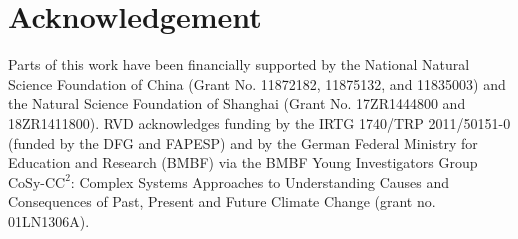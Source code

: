 \documentclass[12pt,aip,cha,reprint,nofootinbib]{revtex4-1}
\begin{document}
\section*{Acknowledgement}
Parts of this work have been financially supported by the National Natural Science Foundation of China (Grant No. 11872182, 11875132, and 11835003) and the Natural Science Foundation of Shanghai (Grant No. 17ZR1444800 and 18ZR1411800). RVD acknowledges funding by the IRTG 1740/TRP 2011/50151-0 (funded by the DFG and FAPESP) and by the German Federal Ministry for Education and Research (BMBF) via the BMBF Young Investigators Group $\text{CoSy-CC}^2$: Complex Systems Approaches to Understanding Causes and Consequences of Past, Present and Future Climate Change (grant no. 01LN1306A).

%
\end{document}
